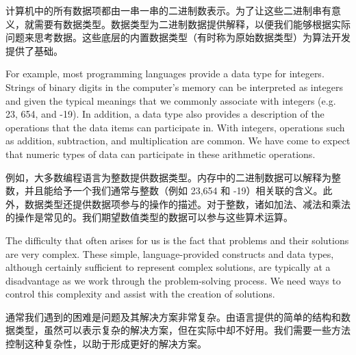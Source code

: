 计算机中的所有数据项都由一串一串的二进制数表示。为了让这些二进制串有意义，就需要有数据类型。数据类型为二进制数据提供解释，以便我们能够根据实际问题来思考数据。这些底层的内置数据类型（有时称为原始数据类型）为算法开发提供了基础。

For example, most programming languages provide a data type for integers. Strings of binary digits in the computer’s memory can be interpreted as integers and given the typical meanings that we commonly associate with integers (e.g. 23, 654, and -19). In addition, a data type also provides a description of the operations that the data items can participate in. With integers, operations such as addition, subtraction, and multiplication are common. We have come to expect that numeric types of data can participate in these arithmetic operations.

例如，大多数编程语言为整数提供数据类型。内存中的二进制数据可以解释为整数，并且能给予一个我们通常与整数（例如 23,654 和 -19）相关联的含义。此外，数据类型还提供数据项参与的操作的描述。对于整数，诸如加法、减法和乘法的操作是常见的。我们期望数值类型的数据可以参与这些算术运算。

The difficulty that often arises for us is the fact that problems and their solutions are very complex. These simple, language-provided constructs and data types, although certainly sufficient to represent complex solutions, are typically at a disadvantage as we work through the problem-solving process. We need ways to control this complexity and assist with the creation of solutions.

通常我们遇到的困难是问题及其解决方案非常复杂。由语言提供的简单的结构和数据类型，虽然可以表示复杂的解决方案，但在实际中却不好用。我们需要一些方法控制这种复杂性，以助于形成更好的解决方案。